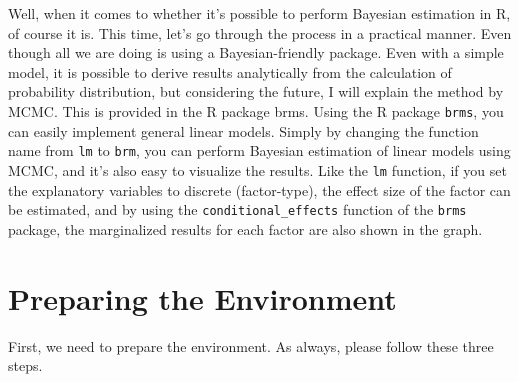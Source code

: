 \documentclass{ltjbook}
\begin{document}
Well, when it comes to whether it's possible to perform Bayesian estimation in R, of course it is. This time, let's go through the process in a practical manner. Even though all we are doing is using a Bayesian-friendly package.
Even with a simple model, it is possible to derive results analytically from the calculation of probability distribution, but considering the future, I will explain the method by MCMC. This is provided in the R package brms.
Using the R package \texttt{brms}, you can easily implement general linear models. Simply by changing the function name from \texttt{lm} to \texttt{brm}, you can perform Bayesian estimation of linear models using MCMC, and it's also easy to visualize the results. Like the \texttt{lm} function, if you set the explanatory variables to discrete (factor-type), the effect size of the factor can be estimated, and by using the \verb|conditional_effects| function of the \texttt{brms} package, the marginalized results for each factor are also shown in the graph.
\section{Preparing the Environment}
First, we need to prepare the environment. As always, please follow these three steps.
\end{document}
